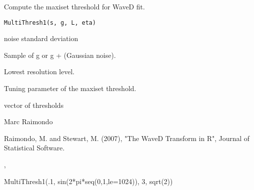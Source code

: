 \documentclass{article}
\begin{document}
\begin{Description}\relax
Compute the maxiset threshold for WaveD fit.
\end{Description}
\begin{Usage}
\begin{verbatim}
MultiThresh1(s, g, L, eta)
\end{verbatim}
\end{Usage}
\begin{Arguments}
\begin{ldescription}
\item[\code{s}] noise standard deviation  
\item[\code{g}] Sample of g or g + (Gaussian noise). 
\item[\code{L}] Lowest resolution level. 
\item[\code{eta}] Tuning parameter of the maxiset threshold. 
\end{ldescription}
\end{Arguments}
\begin{Value}
vector of thresholds
\end{Value}
\begin{Author}\relax
Marc Raimondo
\end{Author}
\begin{References}\relax
Raimondo, M. and Stewart, M. (2007),
"The WaveD Transform in R", Journal of Statistical Software.
\end{References}
\begin{SeeAlso}\relax
{},
\end{SeeAlso}
\begin{Examples}
\begin{ExampleCode}

MultiThresh1(.1, sin(2*pi*seq(0,1,le=1024)), 3, sqrt(2))
\end{ExampleCode}
\end{Examples}
\end{document}
